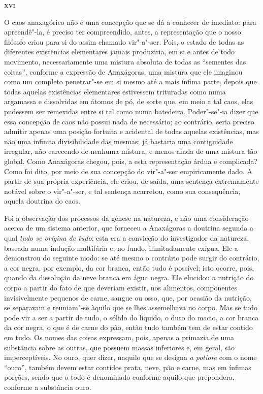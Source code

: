 \bigskip
\textsc{\textbf{xvi}}
\bigskip

O caos anaxagórico não é uma concepção que se dá a conhecer de imediato: para
apreendê"-la, é preciso ter compreendido, antes, a representação que o nosso
filósofo criou para si do assim chamado vir"-a"-ser. Pois, o estado de todas
as diferentes existências elementares jamais produziria, em si e antes de
todo movimento, necessariamente uma mistura absoluta de todas as ``sementes
das coisas'', conforme a expressão de Anaxágoras, uma mistura que ele
imaginou como um completo \label{mistura} penetrar"-se em si mesmo até a mais
ínfima parte, depois que todas aquelas existências elementares estivessem
trituradas como numa argamassa e dissolvidas em átomos de pó, de sorte que,
em meio a tal caos, elas pudessem ser remexidas entre si tal como numa
batedeira. Poder"-se"-ia dizer que essa concepção de caos não possui nada de
necessário; ao contrário, seria preciso admitir apenas uma posição fortuita e
acidental de todas aquelas existências, mas não uma infinita divisibilidade
das mesmas; já bastaria uma contiguidade irregular, não carecendo de nenhuma
mistura, e menos ainda de uma mistura tão global. Como Anaxágoras chegou,
pois, a esta representação árdua e complicada? Como foi dito, por meio de sua
concepção do vir"-a"-ser empiricamente dado. A partir de sua própria
experiência, ele criou, de saída, uma sentença extremamente notável sobre o
vir"-a"-ser, e tal sentença acarretou, como sua consequência, aquela doutrina
do caos.

Foi a observação dos processos da gênese na natureza, e não uma consideração
acerca de um sistema anterior, que forneceu a Anaxágoras a doutrina segunda a
qual \textit{tudo se origina de tudo}; esta era a convicção do investigador
da natureza, baseada numa indução multifária e, no fundo, ilimitadamente
exígua. Ele a demonstrou do seguinte modo: se até mesmo o contrário pode
surgir do contrário, a cor negra, por exemplo, da cor branca, então tudo é
possível; isto ocorre, pois, quando da dissolução da neve branca em água
negra. Ele elucidou a nutrição do corpo a partir do fato de que deveriam
existir, nos alimentos, componentes invisivelmente pequenos de carne, sangue
ou osso, que, por ocasião da nutrição, se separavam e reuniam"-se àquilo que
se lhes assemelhava no corpo. Mas se tudo pode vir a ser a partir de tudo, o
sólido do líquido, o duro do macio, a cor branca da cor negra, o que é de
carne do pão, então tudo também tem de estar contido em tudo. Os nomes das
coisas expressam, pois, apenas a primazia de uma substância sobre as outras,
que possuem massas inferiores e, em geral, são imperceptíveis. No ouro, quer
dizer, naquilo que se designa
\textit{a potiore} com o nome ``ouro'', também devem estar contidos prata,
 neve, pão e carne, mas em ínfimas porções, sendo que o todo é denominado
 conforme aquilo que prepondera, conforme a substância ouro.

